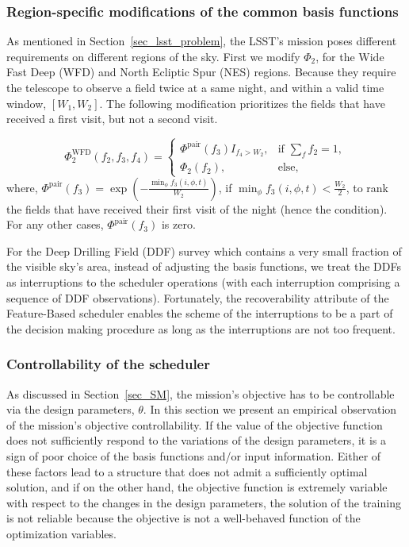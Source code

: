 \documentclass[12pt]{aastex62}
\theoremstyle{definition}
\begin{document}
\subsubsection{Region-specific modifications of the common basis functions}

As mentioned in Section~\ref{sec_lsst_problem}, the LSST's mission poses different requirements on different regions of the sky.  First we modify $\Phi_2$, for the Wide Fast Deep (WFD) and North Ecliptic Spur (NES) regions. Because they require the telescope to observe a field twice at a same night, and within a valid time window, $[W_1,W_2]$. The following modification prioritizes the fields that have received a first visit, but not a second visit.

\begin{equation*}
\Phi_2^{\text{WFD}}(f_2,f_3,f_4) =\begin{cases} \Phi^{\text{pair}}(f_3)I_{f_4> W_2},& \text{if } \sum\limits_{f}{f_2} = 1,\\ \Phi_2(f_2),& \text{else,} \end{cases}
\end{equation*}
where, $\Phi^{\text{pair}}(f_3) = \exp(- \frac{\min_{\phi}f_3(i,\phi,t)}{W_2})$, if $ \min_{\phi}f_3(i,\phi,t) < \frac{W_2}{2}$, to rank the fields that have received their first visit of the night (hence the condition). For any other cases, $\Phi^{\text{pair}}(f_3)$ is zero.

For the Deep Drilling Field (DDF) survey which contains a very small fraction of the visible sky's area, instead of adjusting the basis functions, we treat the DDFs as interruptions to the scheduler operations (with each interruption comprising a sequence of DDF observations). Fortunately, the recoverability attribute of the Feature-Based scheduler enables the scheme of the interruptions to be a part of the decision making procedure as long as the interruptions are not too frequent.

\subsubsection{Controllability of the scheduler}\label{sec_sim_cont}

As discussed in Section~\ref{sec_SM}, the mission's objective has to be controllable via the design parameters, $\theta$. In this section we present an empirical observation of the mission's objective controllability. If the value of the objective function does not sufficiently respond to the variations of the design parameters, it is a sign of poor choice of the basis functions and/or input information. Either of these factors lead to a structure that does not admit a sufficiently optimal solution, and if on the other hand, the objective function is extremely variable with respect to the changes in the design parameters, the solution of the training is not reliable because the objective is not a well-behaved function of the optimization variables.
\end{document}
